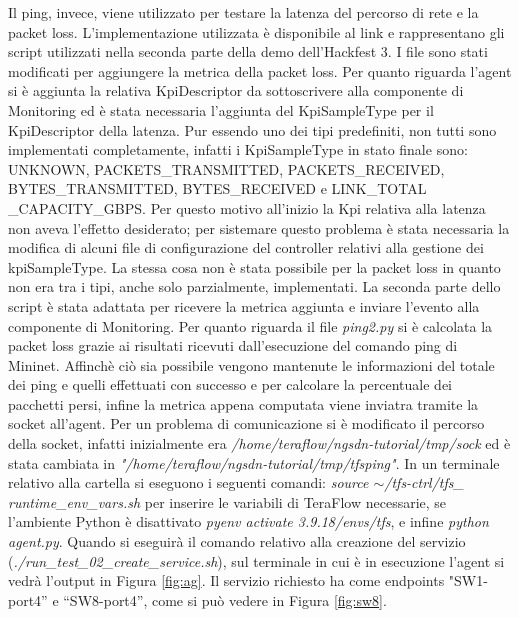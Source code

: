 Il ping, invece, viene utilizzato per testare la latenza del percorso di rete e la packet loss.
L'implementazione utilizzata è disponibile al link \cite{probe} e rappresentano gli script  
utilizzati nella seconda parte della demo dell'Hackfest 3.
\newline I file sono stati modificati per aggiungere la metrica della packet loss. 
Per quanto riguarda l'agent si è aggiunta la relativa KpiDescriptor da sottoscrivere alla componente di Monitoring ed
è stata necessaria l'aggiunta del KpiSampleType per il KpiDescriptor della latenza. 
Pur essendo uno dei tipi predefiniti, non tutti sono implementati completamente, infatti
i KpiSampleType in stato finale sono: UNKNOWN, PACKETS\_TRANSMITTED, PACKETS\_RECEIVED, BYTES\_TRANSMITTED, BYTES\_RECEIVED e LINK\_TOTAL \_CAPACITY\_GBPS.
Per questo motivo all'inizio la Kpi relativa alla latenza non aveva l'effetto desiderato; per sistemare questo problema è stata necessaria la 
modifica di alcuni file di configurazione del controller relativi alla gestione dei kpiSampleType.
La stessa cosa non è stata possibile per la packet loss in quanto non era tra i tipi, anche solo parzialmente, implementati.  
La seconda parte dello script è stata adattata per ricevere la metrica aggiunta e inviare l'evento alla componente di Monitoring.
Per quanto riguarda il file \textit{ping2.py} si è calcolata la packet loss grazie ai risultati ricevuti dall'esecuzione
del comando ping di Mininet.
Affinchè ciò sia possibile vengono mantenute le informazioni del totale dei ping e quelli effettuati con successo e per calcolare la percentuale dei pacchetti persi,
infine la metrica appena computata viene inviatra tramite la socket all'agent.
Per un problema di comunicazione si è modificato il percorso della socket, infatti inizialmente era \textit{/home/teraflow/ngsdn-tutorial/tmp/sock} ed
è stata cambiata in \textit{"/home/teraflow/ngsdn-tutorial/tmp/tfsping"}.
\newline In un terminale relativo alla cartella si eseguono i seguenti comandi: \textit{source $\sim$/tfs-ctrl/tfs\_ runtime\_env\_vars.sh} per inserire le variabili di TeraFlow
necessarie, se l'ambiente Python è disattivato \textit{pyenv activate 3.9.18/envs/tfs}, e infine \textit{python agent.py}.
Quando si eseguirà il comando relativo alla creazione del servizio (\textit{./run\_test\_02\_create\_service.sh}),
sul terminale in cui è in esecuzione l'agent si vedrà l'output in Figura \ref{fig:ag}.
\newline Il servizio richiesto ha come endpoints "SW1-port4” e “SW8-port4”, come si può vedere in Figura \ref{fig:sw8}.
